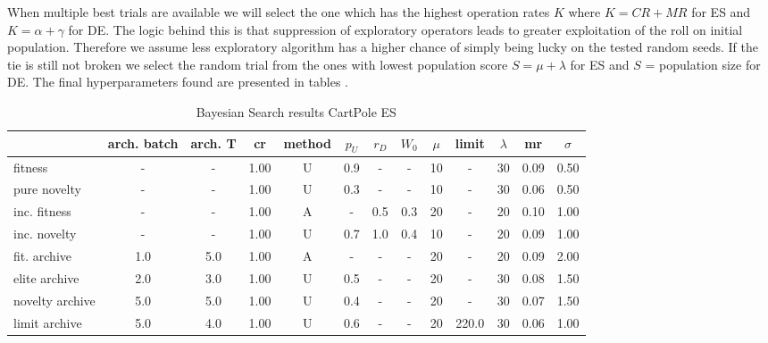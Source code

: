 When multiple best trials are available we will select the one which has the highest operation rates $ K $ where $ K = CR + MR $ for ES and $ K = \alpha + \gamma$ for DE. The logic behind this is that suppression of exploratory operators leads to greater exploitation of the roll on initial population. Therefore we assume less exploratory algorithm has a higher chance of simply being lucky on the tested random seeds.  If the tie is still not broken we select the random trial from the ones with lowest population score $ S = \mu +\lambda $ for ES and  $ S $ = population size  for DE.
The final hyperparameters found are presented in tables .
\begin{table}[ht]
	\centering
	\scriptsize
	\setlength{\tabcolsep}{4pt}
	\renewcommand{\arraystretch}{1.15}
	\begin{tabular}{lcccccccccccc}
		\toprule
		{} & arch. batch & arch. T &   cr & method & $p_U$ & $r_D$ & $W_0$ & $\mu$ &  limit & $\lambda$ &   mr & $\sigma$ \\
		\midrule
		fitness         &           - &       - & 1.00 &      U &   0.9 &     - &     - &    10 &      - &        30 & 0.09 &     0.50 \\
		pure novelty    &           - &       - & 1.00 &      U &   0.3 &     - &     - &    10 &      - &        30 & 0.06 &     0.50 \\
		inc. fitness    &           - &       - & 1.00 &      A &     - &   0.5 &   0.3 &    20 &      - &        20 & 0.10 &     1.00 \\
		inc. novelty    &           - &       - & 1.00 &      U &   0.7 &   1.0 &   0.4 &    10 &      - &        20 & 0.09 &     1.00 \\
		fit. archive    &         1.0 &     5.0 & 1.00 &      A &     - &     - &     - &    20 &      - &        20 & 0.09 &     2.00 \\
		elite archive   &         2.0 &     3.0 & 1.00 &      U &   0.5 &     - &     - &    20 &      - &        30 & 0.08 &     1.50 \\
		novelty archive &         5.0 &     5.0 & 1.00 &      U &   0.4 &     - &     - &    20 &      - &        30 & 0.07 &     1.50 \\
		limit archive   &         5.0 &     4.0 & 1.00 &      U &   0.6 &     - &     - &    20 &  220.0 &        30 & 0.06 &     1.00 \\
		\bottomrule
	\end{tabular}
	
	\caption{Bayesian Search results CartPole ES}
	\label{tab:optunaRes1}
\end{table}

